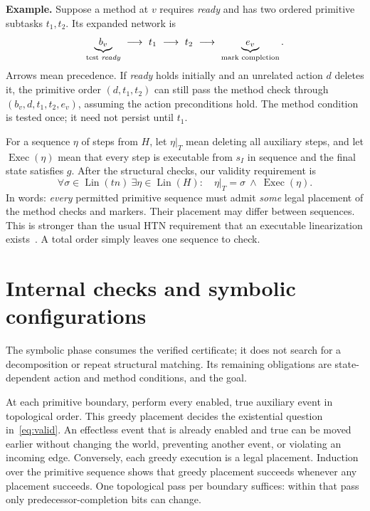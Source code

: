 \documentclass[10pt,a4paper,twocolumn]{article}
\newcommand{\Lin}{\operatorname{Lin}}
\begin{document}
\textbf{Example.} Suppose a method at $v$ requires \textit{ready} and has two ordered primitive subtasks $t_1,t_2$. Its expanded network is
\[
 \underbrace{b_v}_{\text{test \textit{ready}}}\ \longrightarrow\ t_1\ \longrightarrow\ t_2\ \longrightarrow\
 \underbrace{e_v}_{\text{mark completion}}.
\]
Arrows mean precedence. If \textit{ready} holds initially and an unrelated action $d$ deletes it, the primitive order $(d,t_1,t_2)$ can still pass the method check through $(b_v,d,t_1,t_2,e_v)$, assuming the action preconditions hold. The method condition is tested once; it need not persist until $t_1$.

For a sequence $\eta$ of steps from $H$, let $\eta|_T$ mean deleting all auxiliary steps, and let $\operatorname{Exec}(\eta)$ mean that every step is executable from $s_I$ in sequence and the final state satisfies $g$. After the structural checks, our validity requirement is
\begin{equation}\label{eq:valid}
 \forall\sigma\in\Lin(tn)\ \exists\eta\in\Lin(H):
 \quad \eta|_T=\sigma\ \land\ \operatorname{Exec}(\eta).
\end{equation}
In words: \emph{every} permitted primitive sequence must admit \emph{some} legal placement of the method checks and markers. Their placement may differ between sequences. This is stronger than the usual HTN requirement that an executable linearization exists~\cite{geier}. A total order simply leaves one sequence to check.


\section{Internal checks and symbolic configurations}
The symbolic phase consumes the verified certificate; it does not search for a
decomposition or repeat structural matching. Its remaining obligations are
state-dependent action and method conditions, and the goal.

At each primitive boundary, perform every enabled, true auxiliary event in
topological order. This greedy placement decides the existential question
in~\eqref{eq:valid}. An effectless event that is already enabled and true can be
moved earlier without changing the world, preventing another event, or violating
an incoming edge. Conversely, each greedy execution is a legal placement.
Induction over the primitive sequence shows that greedy placement succeeds
whenever any placement succeeds. One topological pass per boundary suffices:
within that pass only predecessor-completion bits can change.
\end{document}
